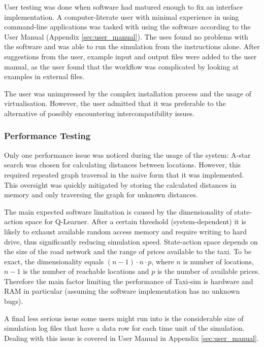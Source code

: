 User testing was done when software had matured enough to fix an interface
implementation. A computer-literate user with minimal experience in using
command-line applications was tasked with using the software according to the
User Manual (Appendix \ref{sec:user_manual}). The uses found no problems with
the software and was able to run the simulation from the instructions alone.
After suggestions from the user, example input and output files were added to
the user manual, as the user found that the workflow was complicated by looking
at examples in external files.

The user was unimpressed by the complex installation process and the usage of
virtualisation. However, the user admitted that it was preferable to the
alternative of possibly encountering intercompatibility issues.

\subsubsection{Performance Testing}
\label{sec:implementation:testing:performance}

Only one performance issue was noticed during the usage of the system: A-star
search was chosen for calculating distances between locations. However, this
required repeated graph traversal in the naive form that it was implemented.
This oversight was quickly mitigated by storing the calculated distances in
memory and only traversing the graph for unknown distances.

The main expected software limitation is caused by the dimensionality of state-
action space for Q-Learner. After a certain threshold (system-dependent) it is
likely to exhaust available random access memory and require writing to hard
drive, thus significantly reducing simulation speed. State-action space depends
on the size of the road network and the range of prices available to the taxi.
To be exact, the dimensionality equals \( (n-1) \cdot n \cdot p\), where \(n\)
is number of locations, \(n-1\) is the number of reachable locations and \(p\)
is the number of available prices. Therefore the main factor limiting the
performance of Taxi-sim is hardware and RAM in particular (assuming the
software implementation has no unknown bugs).

A final less serious issue some users might run into is the considerable
size of simulation log files that have a data row for each time unit of the
simulation. Dealing with this issue is covered in User Manual in Appendix \ref{sec:user_manual}.
